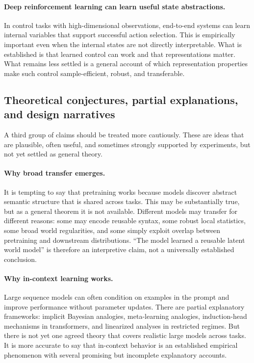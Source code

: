 \paragraph{Deep reinforcement learning can learn useful state abstractions.}
In control tasks with high-dimensional observations, end-to-end systems can learn internal variables that support successful action selection. This is empirically important even when the internal states are not directly interpretable. What is established is that learned control can work and that representations matter. What remains less settled is a general account of which representation properties make such control sample-efficient, robust, and transferable.

\subsection*{Theoretical conjectures, partial explanations, and design narratives}

A third group of claims should be treated more cautiously. These are ideas that are plausible, often useful, and sometimes strongly supported by experiments, but not yet settled as general theory.

\paragraph{Why broad transfer emerges.}
It is tempting to say that pretraining works because models discover abstract semantic structure that is shared across tasks. This may be substantially true, but as a general theorem it is not available. Different models may transfer for different reasons: some may encode reusable syntax, some robust local statistics, some broad world regularities, and some simply exploit overlap between pretraining and downstream distributions. ``The model learned a reusable latent world model'' is therefore an interpretive claim, not a universally established conclusion.

\paragraph{Why in-context learning works.}
Large sequence models can often condition on examples in the prompt and improve performance without parameter updates. There are partial explanatory frameworks: implicit Bayesian analogies, meta-learning analogies, induction-head mechanisms in transformers, and linearized analyses in restricted regimes. But there is not yet one agreed theory that covers realistic large models across tasks. It is more accurate to say that in-context behavior is an established empirical phenomenon with several promising but incomplete explanatory accounts.

